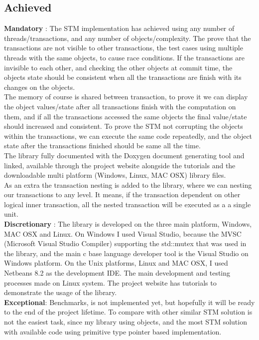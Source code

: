 \documentclass[12pt]{article}
\begin{document}
\subsection{Achieved}
\textbf{Mandatory} : The STM implementation has achieved using any number of threads/transactions, and any number of objects/complexity. The prove that the transactions are not visible to other transactions, the test cases using multiple threads with the same objects, to cause race conditions. If the transactions are invisible to each other, and checking the other objects at commit time, the objects state should be consistent when all the transactions are finish with its changes on the objects.\\
The memory of course is shared between transaction, to prove it we can display the object values/state after all transactions finish with the computation on them, and if all the transactions accessed the same objects the final value/state should increased and consistent. To prove the STM not corrupting the objects within the transactions, we can execute the same code repeatedly, and the object state after the transactions finished should be same all the time.\\

The library fully documented with the Doxygen document generating tool and linked, available through the project website alongside the tutorials and the downloadable multi platform (Windows, Linux, MAC OSX) library files.\\

As an extra the transaction nesting is added to the library, where we can nesting our transactions to any level. It means, if the transaction dependent on other logical inner transaction, all the nested transaction will be executed as a a single unit.\\

\textbf{Discretionary} : The library is developed on the three main platform, Windows, MAC OSX and Linux. On Windows I used Visual Studio, because the MVSC (Microsoft Visual Studio Compiler) supporting the std::mutex that was used in the library, and the main c base language developer tool is the Visual Studio on Windows platform. On the Unix platforms, Linux and MAC OSX, I used Netbeans 8.2 as the development IDE. The main development and testing processes made on Linux system. The project website has tutorials to demonstrate the usage of the library.\\

\textbf{Exceptional}: Benchmarks, is not implemented yet, but hopefully it will be ready to the end of the project lifetime. To compare with other similar STM solution is not the easiest task, since my library using objects, and the most STM solution with available code using primitive type pointer based implementation. 
\end{document}
